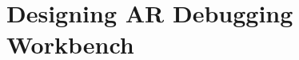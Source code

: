 \documentclass [11pt, proquest] {uwthesis}[2020/02/24]
\begin{document}
 
 
\chapter{Designing AR Debugging Workbench}

\end{document}
